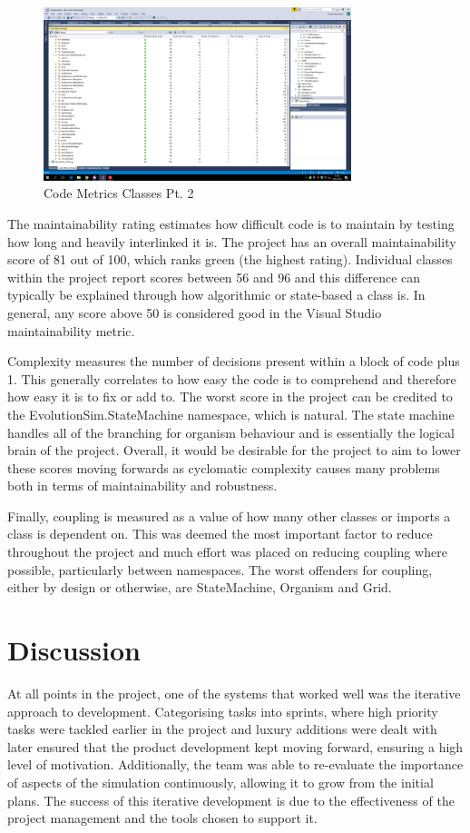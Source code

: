 \documentclass[a4paper, oneside, 11pt]{report}
\begin{document}
\begin{figure}[H]
	\caption{Code Metrics Classes Pt. 2}\label{metrics-3}
	\centering
	\includegraphics[width=0.8\textwidth]{metrics-3}
\end{figure}

The maintainability rating estimates how difficult code is to maintain by testing how long and heavily interlinked it is. The project has an overall maintainability score of 81 out of 100, which ranks green (the highest rating). Individual classes within the project report scores between 56 and 96 and this difference can typically be explained through how algorithmic or state-based a class is. In general, any score above 50 is considered good in the Visual Studio maintainability metric.

Complexity measures the number of decisions present within a block of code plus 1. This generally correlates to how easy the code is to comprehend and therefore how easy it is to fix or add to. The worst score in the project can be credited to the EvolutionSim.StateMachine namespace, which is natural. The state machine handles all of the branching for organism behaviour and is essentially the logical brain of the project. Overall, it would be desirable for the project to aim to lower these scores moving forwards as cyclomatic complexity causes many problems both in terms of maintainability and robustness.

Finally, coupling is measured as a value of how many other classes or imports a class is dependent on. This was deemed the most important factor to reduce throughout the project and much effort was placed on reducing coupling where possible, particularly between namespaces. The worst offenders for coupling, either by design or otherwise, are StateMachine, Organism and Grid. 

\chapter{Discussion}\label{discussion}
At all points in the project, one of the systems that worked well was the iterative approach to development. Categorising tasks into sprints, where high priority tasks were tackled earlier in the project and luxury additions were dealt with later ensured that the product development kept moving forward, ensuring a high level of motivation. Additionally, the team was able to re-evaluate the importance of aspects of the simulation continuously, allowing it to grow from the initial plans. The success of this iterative development is due to the effectiveness of the project management and the tools chosen to support it.
\end{document}

